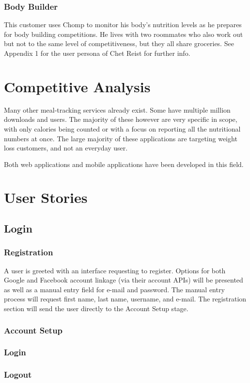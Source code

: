 \documentclass[a4paper,12pt]{article}
\begin{document}
\subsubsection*{Body Builder}
This customer uses Chomp to monitor his body's nutrition levels as he prepares for body building competitions.  He lives with two roommates who also work out but not to the same level of competitiveness, but they all share groceries.  See Appendix 1 for the user persona of Chet Reist for further info.
\section*{Competitive Analysis}
Many other meal-tracking services already exist.  Some have multiple million downloads and users.  The majority of these however are very specific in scope, with only calories being counted or with a focus on reporting all the nutritional numbers at once.  The large majority of these applications are targeting weight loss customers, and not an everyday user.

Both web applications and mobile applications have been developed in this field.
\section*{User Stories}
\subsection{Login}
\subsubsection{Registration}
A user is greeted with an interface requesting to register.  Options for both Google and Facebook account linkage (via their account APIs) will be presented as well as a manual entry field for e-mail and password.  The manual entry process will request first name, last name, username, and e-mail.  The registration section will send the user directly to the Account Setup stage.
\subsubsection{Account Setup}

\subsubsection{Login}

\subsubsection{Logout}
\end{document}
